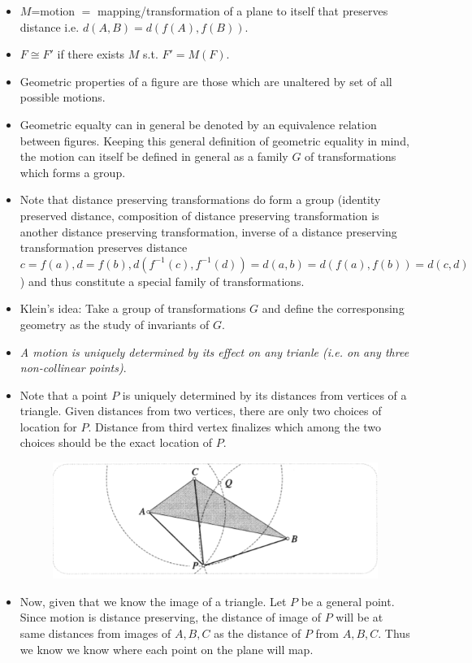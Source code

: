 \documentclass[12pt]{article}
\def\tt{\textit}
\begin{document}
\begin{itemize}
    \item $M$=motion $=$ mapping/transformation of a plane to itself that preserves distance i.e. $d(A,B) = d(f(A),f(B))$.
    \item $F\cong F'$ if there exists $M$ s.t. $F'=M(F)$.
    \item Geometric properties of a figure are those which are unaltered by set of all possible motions.
    \item Geometric equalty can in general be denoted by an equivalence relation between figures. Keeping this general definition of geometric equality in mind, the motion can itself be defined in general as a family $G$ of transformations which forms a group.
    \item Note that distance preserving transformations do form a group (identity preserved distance, composition of distance preserving transformation is another distance preserving transformation, inverse of a distance preserving transformation preserves distance $c=f(a),d=f(b), d(f^{-1}(c),f^{-1}(d)) = d(a,b) = d(f(a),f(b)) = d(c,d)$) and thus constitute a special family of transformations.
    \item Klein's idea: Take a group of transformations $G$ and define the corresponsing geometry as the study of invariants of $G$.
    \item \tt{A motion is uniquely determined by its effect on any trianle (i.e. on any three non-collinear points)}.
    \item Note that a point $P$ is uniquely determined by its distances from vertices of a triangle. Given distances from two vertices, there are only two choices of location for $P$. Distance from third vertex finalizes which among the two choices should be the exact location of $P$.

    \begin{figure}[h!]
        \centering
        \includegraphics[scale=0.85]{fig_6}
        \label{f6}
    \end{figure}

    \item Now, given that we know the image of a triangle. Let $P$ be a general point. Since motion is distance preserving, the distance of image of $P$ will be at same distances from images of $A,B,C$ as the distance of $P$ from $A,B,C$. Thus we know we know where each point on the plane will map.


\end{itemize}
\end{document}
